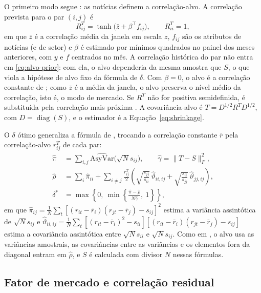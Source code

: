 O primeiro modo segue \citet{becquin2023}: as notícias definem a correlação-alvo. A correlação prevista
para o par $(i,j)$ é
\begin{equation}
  R^T_{ij} = \tanh\!\bigl(\bar z + \beta^\top f_{ij}\bigr),\qquad R^T_{ii}=1,
  \label{eq:alvo-prior}
\end{equation}
em que $\bar z$ é a correlação média da janela em escala $z$, $f_{ij}$ são os atributos de notícias (e de
setor) e $\beta$ é estimado por mínimos quadrados no painel dos meses anteriores, com $y$ e $f$
centrados no mês. A correlação histórica do par não entra em \eqref{eq:alvo-prior}: com ela, o alvo
dependeria da mesma amostra que $S$, o que viola a hipótese de alvo fixo da fórmula de $\delta$. Com
$\beta=0$, o alvo é a correlação constante de \citet{ledoit2004honey}; como $\bar z$ é a média da janela,
o alvo preserva o nível médio da correlação, isto é, o modo de mercado. Se $R^T$ não for positiva
semidefinida, é substituída pela correlação mais próxima \citep{higham2002}. A covariância-alvo é
$T=D^{1/2}R^TD^{1/2}$, com $D=\operatorname{diag}(S)$, e o estimador é a Equação~\eqref{eq:shrinkage}.

O $\delta$ ótimo generaliza a fórmula de \citet{ledoit2004honey}, trocando a correlação constante
$\bar r$ pela correlação-alvo $r^T_{ij}$ de cada par:
\begin{align}
  \hat\pi &= \sum_{i,j}\widehat{\mathrm{AsyVar}}\bigl(\sqrt N s_{ij}\bigr), \qquad
  \hat\gamma = \|T-S\|_F^2, \nonumber\\
  \hat\rho &= \sum_i\hat\pi_{ii} + \sum_{i\neq j}\frac{r^T_{ij}}{2}
     \left(\sqrt{\frac{s_{jj}}{s_{ii}}}\,\hat\vartheta_{ii,ij} + \sqrt{\frac{s_{ii}}{s_{jj}}}\,\hat\vartheta_{jj,ij}\right),
  \label{eq:delta-geral}\\
  \delta^* &= \max\!\left\{0,\ \min\!\left\{\frac{\hat\pi-\hat\rho}{N\hat\gamma},\ 1\right\}\right\}, \nonumber
\end{align}
em que $\hat\pi_{ij}=\frac1N\sum_t[(r_{it}-\bar r_i)(r_{jt}-\bar r_j)-s_{ij}]^2$ estima a variância
assintótica de $\sqrt N s_{ij}$ e
$\hat\vartheta_{ii,ij}=\frac1N\sum_t[(r_{it}-\bar r_i)^2-s_{ii}][(r_{it}-\bar r_i)(r_{jt}-\bar r_j)-s_{ij}]$
estima a covariância assintótica entre $\sqrt N s_{ii}$ e $\sqrt N s_{ij}$. Como em
\citet{ledoit2004honey}, o alvo usa as variâncias amostrais, as covariâncias entre as variâncias e os
elementos fora da diagonal entram em $\hat\rho$, e $S$ é calculada com divisor $N$ nessas fórmulas.

\subsection{Fator de mercado e correlação residual}

